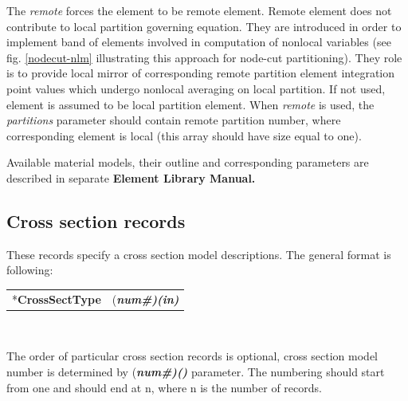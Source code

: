 \documentclass[a4paper]{article}
\makeatletter
\newcommand{\param}[1]{{\em #1}}
\newcommand{\fieldVal}[2]{\mbox{({\it\bf{#1}\#)\tiny (#2)}}}
\newcommand{\entKeyword}[1]{\mbox{{*{\bf{#1}}}}}
\newcommand{\Pmode}[1]{{\sffamily #1}}
\newenvironment{record}[1][]{\begin{tabular}{|ll}}{\end{tabular}\\}
\newcommand{\recentry}[2]{{#1}&{#2}\\}
\newcounter{rcc}
\newenvironment{record}[1][\textwidth]{\setcounter{rcc}{0}\begin{tabular*}{#1}{|ll@{\extracolsep{\fill}}r}}{\end{tabular*}\\}
\newcommand{\recentry}[2]{\ifthenelse{\value{rcc}>0}{&$\backslash$ \\}{\setcounter{rcc}{1}}{#1}&{#2}}
\makeatother
\begin{document}
\Pmode{
The \param{remote} forces the element to be remote element. Remote
element does not contribute to local partition governing equation.
They are introduced in order to implement band of elements involved
in computation of nonlocal variables (see fig. \ref{nodecut-nlm} illustrating
this approach for node-cut partitioning). They role is to provide
local mirror of corresponding remote partition element integration point values which undergo
nonlocal averaging on local partition.
If not used, element is assumed to be local partition element.
When \param{remote} is used, the \param{partitions} parameter should
contain remote partition number, where
corresponding element is local (this array should have size equal to one).
}


Available material models, their outline and
corresponding parameters are described in separate {\bf Element Library Manual.}

\subsection{Cross section records}
\label{_CrossSectionRecords}
These records specify a cross section model descriptions. The general format is
following:

\begin{record}[0.9\textwidth]
  \recentry{\entKeyword{CrossSectType}}{\fieldVal{num}{in}}
\end{record}

The order of particular cross section records is optional, cross section
model number is determined by \fieldVal{num}{} parameter.
The numbering should start from one and should end at n, where n is the number of records.
\end{document}
